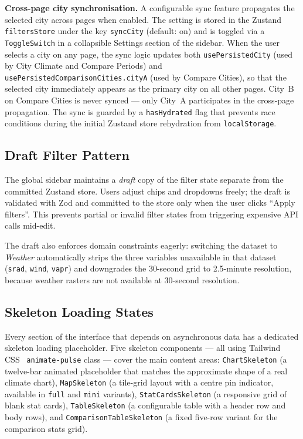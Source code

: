 \textbf{Cross-page city synchronisation.} A configurable sync feature
propagates the selected city across pages when enabled. The setting is stored
in the Zustand \texttt{filtersStore} under the key \texttt{syncCity}
(default: on) and is toggled via a \texttt{ToggleSwitch} in a collapsible
Settings section of the sidebar. When the user selects a city on any page,
the sync logic updates both \texttt{usePersistedCity} (used by City Climate
and Compare Periods) and \texttt{usePersistedComparisonCities.cityA} (used
by Compare Cities), so that the selected city immediately appears as the
primary city on all other pages. City~B on Compare Cities is never synced ---
only City~A participates in the cross-page propagation. The sync is guarded
by a \texttt{hasHydrated} flag that prevents race conditions during the
initial Zustand store rehydration from \texttt{localStorage}.

\subsection{Draft Filter Pattern}\label{APP_ARCH_DRAFT}

The global sidebar maintains a \emph{draft} copy of the filter state separate
from the committed Zustand store. Users adjust chips and dropdowns freely; the
draft is validated with Zod and committed to the store only when the user clicks
``Apply filters''. This prevents partial or invalid filter states from triggering
expensive API calls mid-edit.

The draft also enforces domain constraints eagerly: switching the dataset to
\emph{Weather} automatically strips the three variables unavailable in that
dataset (\texttt{srad}, \texttt{wind}, \texttt{vapr}) and downgrades the
30-second grid to 2.5-minute resolution, because weather rasters are not
available at 30-second resolution.

\subsection{Skeleton Loading States}\label{APP_ARCH_SKELETONS}

Every section of the interface that depends on asynchronous data has a
dedicated skeleton loading placeholder. Five skeleton components --- all
using Tailwind CSS~\cite{tailwindcss} \texttt{animate-pulse}
class --- cover the main content areas:
\texttt{ChartSkeleton} (a twelve-bar animated placeholder that matches the
approximate shape of a real climate chart), \texttt{MapSkeleton} (a tile-grid
layout with a centre pin indicator, available in \texttt{full} and
\texttt{mini} variants), \texttt{StatCardsSkeleton} (a responsive grid of
blank stat cards), \texttt{TableSkeleton} (a configurable table with a header
row and body rows), and \texttt{ComparisonTableSkeleton} (a fixed five-row
variant for the comparison stats grid).

